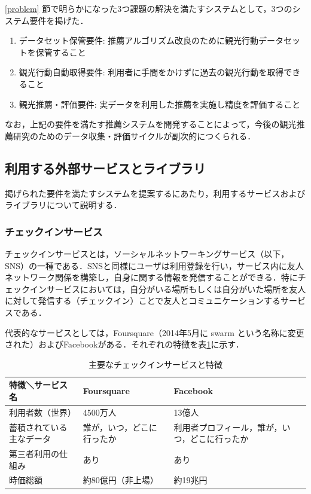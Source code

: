 \documentclass{jsarticle}
\begin{document}
\ref{problem} 節で明らかになった3つ課題の解決を満たすシステムとして，3つのシステム要件を掲げた．

\begin{enumerate}
\item データセット保管要件: 推薦アルゴリズム改良のために観光行動データセットを保管すること
\item 観光行動自動取得要件: 利用者に手間をかけずに過去の観光行動を取得できること
\item 観光推薦・評価要件: 実データを利用した推薦を実施し精度を評価すること
\end{enumerate}



なお，上記の要件を満たす推薦システムを開発することによって，今後の観光推薦研究のためのデータ収集・評価サイクルが副次的につくられる．

\subsection{利用する外部サービスとライブラリ}

掲げられた要件を満たすシステムを提案するにあたり，利用するサービスおよびライブラリについて説明する．

\subsubsection{チェックインサービス}

チェックインサービスとは，ソーシャルネットワーキングサービス（以下，SNS）の一種である．SNSと同様にユーザは利用登録を行い，サービス内に友人ネットワーク関係を構築し，自身に関する情報を発信することができる．特にチェックインサービスにおいては，自分がいる場所もしくは自分がいた場所を友人に対して発信する（チェックイン）ことで友人とコミュニケーションするサービスである．

代表的なサービスとしては，Foursquare\cite{foursquare}（2014年5月に swarm という名称に変更された）およびFacebook\cite{facebook}がある．それぞれの特徴を表\ref{features_of_checkin_service}に示す．

\begin{table}[!h]
\small
\caption{主要なチェックインサービスと特徴}
\begin{center}
\begin{tabular}{lll}
\label{features_of_checkin_service}
特徴＼サービス名            & Foursquare                    & Facebook \\ \hline
利用者数（世界）            & 4500万人                      & 13億人 \\
蓄積されている主なデータ    & 誰が，いつ，どこに行ったか    & 利用者プロフィール，誰が，いつ，どこに行ったか \\
第三者利用の仕組み          & あり                          & あり \\
時価総額                    & 約80億円（非上場）            & 約19兆円 \\
\end{tabular}
\end{center}
\end{table}
\end{document}
